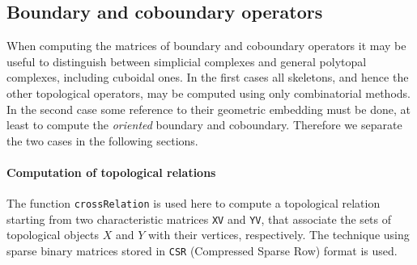 \documentclass[11pt,oneside]{article}    %
\begin{document}
\subsection{Boundary and coboundary operators}

When computing the matrices of boundary and coboundary operators it may be useful to distinguish between simplicial complexes and general polytopal complexes, including  cuboidal ones. In the first cases all skeletons, and hence the other topological operators, may be computed using only combinatorial methods. In the second case some reference to their geometric embedding must be done, at least to compute the \emph{oriented} boundary and coboundary. Therefore we separate the two cases in the following sections.


\paragraph{Computation of topological relations} 
The function \texttt{crossRelation} is used here to compute a topological relation starting from two characteristic matrices \texttt{XV} and \texttt{YV}, that associate the sets of topological objects $X$ and $Y$ with their vertices, respectively.
The technique using sparse binary matrices stored in \texttt{CSR} (Compressed Sparse Row) format is used.
\end{document}
